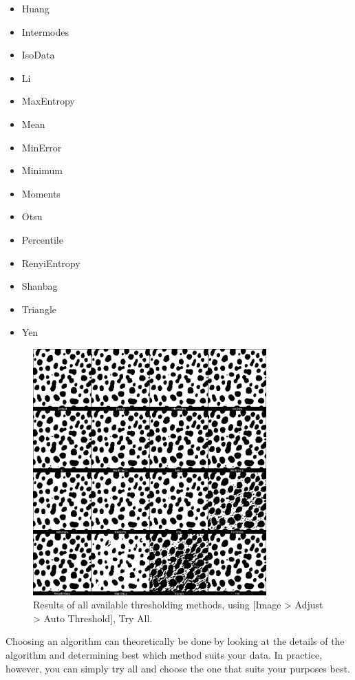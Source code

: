 \begin{itemize}
	\item Huang
	\item Intermodes
	\item IsoData
	\item Li
	\item MaxEntropy
	\item Mean
	\item MinError
	\item Minimum
	\item Moments
	\item Otsu
	\item Percentile
	\item RenyiEntropy
	\item Shanbag
	\item Triangle
	\item Yen
\end{itemize}

\begin{figure}[!ht]
	\centering
		\includegraphics[width=0.80\textwidth]{mod3/figures/all-thresholds.png}
	\caption{Results of all available thresholding methods, using [Image > Adjust > Auto Threshold], Try All. }
	\label{fig:all-thresholds}
\end{figure}

Choosing an algorithm can theoretically be done by looking at the details of the algorithm and determining best which method suits your data. In practice, however, you can simply try all and choose the one that suits your purposes best. 

